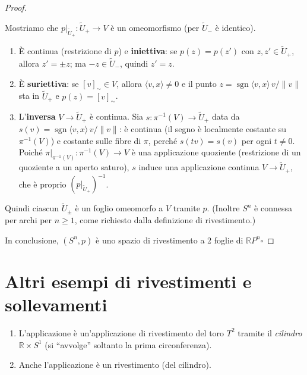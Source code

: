 \begin{proof}
\begin{itemize}
    Mostriamo che $p|_{\widetilde{U}_+}: \widetilde{U}_+ \to V$ \`e un omeomorfismo (per $\widetilde{U}_-$ \`e identico).
    \begin{enumerate}[label=\roman*)]
        \item \`E continua (restrizione di $p$) e \textbf{iniettiva}: se $p(z) = p(z')$ con $z, z' \in \widetilde{U}_+$, allora $z' = \pm z$; ma $-z \in \widetilde{U}_-$, quindi $z' = z$.
        \item \`E \textbf{suriettiva}: se $[v]_\sim \in V$, allora $\langle v, x \rangle \neq 0$ e il punto $z = \operatorname{sgn}\langle v,x\rangle \, v/\|v\|$ sta in $\widetilde{U}_+$ e $p(z) = [v]_\sim$.
        \item L'\textbf{inversa} $V \to \widetilde{U}_+$ \`e continua. Sia $s: \pi^{-1}(V) \to \widetilde{U}_+$ data da $s(v) = \operatorname{sgn}\langle v,x\rangle\, v/\|v\|$: \`e continua (il segno \`e localmente costante su $\pi^{-1}(V)$) e costante sulle fibre di $\pi$, perch\'e $s(tv) = s(v)$ per ogni $t \neq 0$. Poich\'e $\pi|_{\pi^{-1}(V)}: \pi^{-1}(V) \to V$ \`e una applicazione quoziente (restrizione di un quoziente a un aperto saturo), $s$ induce una applicazione continua $V \to \widetilde{U}_+$, che \`e proprio $(p|_{\widetilde{U}_+})^{-1}$.
    \end{enumerate}
    Quindi ciascun $\widetilde{U}_\pm$ \`e un foglio omeomorfo a $V$ tramite $p$. (Inoltre $S^n$ \`e connessa per archi per $n \geqslant 1$, come richiesto dalla definizione di rivestimento.)
\end{itemize}
In conclusione, $(S^n, p)$ è uno spazio di rivestimento a 2 foglie di $\mathbb{R}P^n$\hfill$\square$
\end{proof}

\section{Altri esempi di rivestimenti e sollevamenti}

\begin{ejemplo}
\begin{enumerate}
    \item L'applicazione
    \`e un'applicazione di rivestimento del toro $T^2$ tramite il \emph{cilindro} $\mathbb{R} \times S^1$ (si ``avvolge'' soltanto la prima circonferenza).
    \item Anche l'applicazione
    \`e un rivestimento (del cilindro).
\end{enumerate}
\end{ejemplo}

